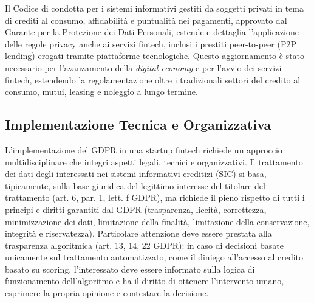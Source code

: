 Il Codice di condotta per i sistemi informativi gestiti da soggetti privati in tema di crediti al consumo, affidabilità e puntualità nei pagamenti, approvato dal Garante per la Protezione dei Dati Personali, estende e dettaglia l'applicazione delle regole privacy anche ai servizi fintech, inclusi i prestiti peer-to-peer (P2P lending) erogati tramite piattaforme tecnologiche. Questo aggiornamento è stato necessario per l'avanzamento della \textit{digital economy} e per l'avvio dei servizi fintech, estendendo la regolamentazione oltre i tradizionali settori del credito al consumo, mutui, leasing e noleggio a lungo termine.

\subsection{Implementazione Tecnica e Organizzativa}
L'implementazione del GDPR in una startup fintech richiede un approccio multidisciplinare che integri aspetti legali, tecnici e organizzativi. Il trattamento dei dati degli interessati nei sistemi informativi creditizi (SIC) si basa, tipicamente, sulla base giuridica del legittimo interesse del titolare del trattamento (art. 6, par. 1, lett. f GDPR), ma richiede il pieno rispetto di tutti i principi e diritti garantiti dal GDPR (trasparenza, liceità, correttezza, minimizzazione dei dati, limitazione della finalità, limitazione della conservazione, integrità e riservatezza). Particolare attenzione deve essere prestata alla trasparenza algoritmica (art. 13, 14, 22 GDPR): in caso di decisioni basate unicamente sul trattamento automatizzato, come il diniego all'accesso al credito basato su scoring, l'interessato deve essere informato sulla logica di funzionamento dell'algoritmo e ha il diritto di ottenere l'intervento umano, esprimere la propria opinione e contestare la decisione.

